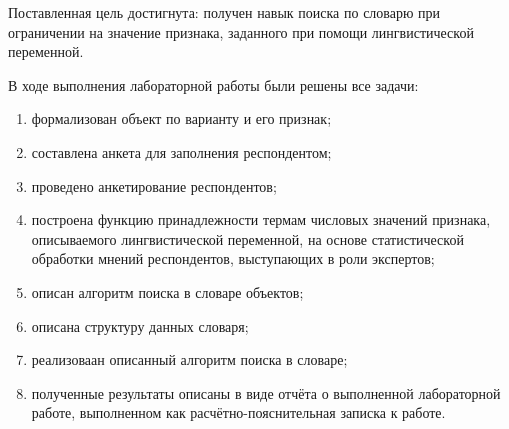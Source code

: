 
Поставленная цель достигнута: получен навык поиска по словарю при ограничении на значение признака, заданного при помощи лингвистической переменной.

В ходе выполнения лабораторной работы были решены все задачи:

\begin{enumerate}[label=\arabic*), itemindent=1em]
	\item формализован объект по варианту и его признак;
	\item составлена анкета для заполнения респондентом;
	\item проведено анкетирование респондентов;
	\item построена функцию принадлежности термам числовых значений признака, описываемого лингвистической переменной, на основе статистической обработки мнений респондентов, выступающих в роли экспертов;
	\item описан алгоритм поиска в словаре объектов;
	\item описана структуру данных словаря;
	\item реализоваан описанный алгоритм поиска в словаре;
	\item полученные результаты описаны в виде отчёта о выполненной лабораторной работе, выполненном как расчётно-пояснительная записка к работе.
\end{enumerate}
